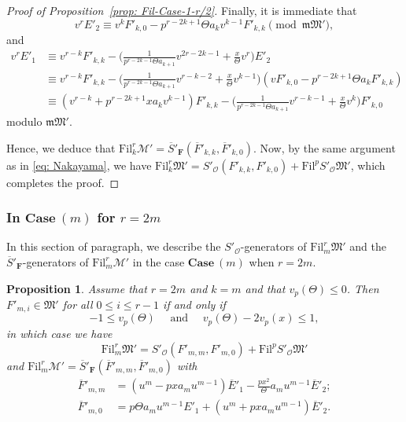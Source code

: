 \documentclass[11pt]{amsart}
\theoremstyle{definition}
\numberwithin{equation}{subsection}
\theoremstyle{plain}
\theoremstyle{plain}
\theoremstyle{plain}
\theoremstyle{plain}
\theoremstyle{plain}
\theoremstyle{plain}
\theoremstyle{plain}
\theoremstyle{plain}
\newtheorem{prop}[equation]{Proposition}
\theoremstyle{plain}
\theoremstyle{plain}
\theoremstyle{plain}
\theoremstyle{plain}
\theoremstyle{definition}
\theoremstyle{definition}
\theoremstyle{definition}
\theoremstyle{remark}
\renewcommand{\(}{\textup{(}}
\renewcommand{\)}{\textup{)}}
\newcommand{\F}{\mathbf{F}}
\newcommand{\barS}{\overline{S}}
\newcommand{\cM}{\mathcal{M}}
\newcommand{\fM}{\mathfrak{M}}
\newcommand{\fm}{\mathfrak{m}}
\newcommand{\Fil}{\mathrm{Fil}}
\newcommand{\cO}{\mathcal{O}}
\newcommand{\barE}{\overline{E}}
\newcommand{\barF}{\overline{F}}
\begin{document}
\begin{proof}[Proof of Proposition~\ref{prop: Fil-Case-1-r/2}]
Finally, it is immediate that $$v^rE'_2
    \equiv
    v^{k}F'_{k,0}-p^{r-2k+1}\Theta a_kv^{k-1}F'_{k,k}\pmod{\fm\fM'},$$
and
\begin{align*}
v^rE'_1
    &\equiv v^{r-k}F'_{k,k}-\bigg(\frac{1}{p^{r-2k-1}\Theta a_{k+1}}v^{2r-2k-1}+\frac{x}{\Theta}v^r\bigg)E'_2 \\
    &\equiv v^{r-k}F'_{k,k}-\bigg(\frac{1}{p^{r-2k-1}\Theta a_{k+1}}v^{r-k-2}+\frac{x}{\Theta}v^{k-1}\bigg)\left(vF'_{k,0}-p^{r-2k+1}\Theta a_kF'_{k,k}\right)\\
    &\equiv
    (v^{r-k}+p^{r-2k+1}xa_kv^{k-1})F'_{k,k}
    -\bigg(\frac{1}{p^{r-2k-1}\Theta a_{k+1}}v^{r-k-1}+\frac{x}{\Theta}v^k\bigg)F'_{k,0}
\end{align*}
modulo $\fm\fM'$.


Hence, we deduce that $\Fil^r_{k}\cM'=\barS'_\F(\barF'_{k,k},\barF'_{k,0})$. Now, by the same argument as in \eqref{eq: Nakayama}, we have $\Fil^r_{k}\fM'=S'_\cO(F'_{k,k},F'_{k,0})+\Fil^pS'_\cO\fM'$, which completes the proof.
\end{proof}





\subsubsection{\textbf{In $\mathbf{Case}~(m)$ for $r=2m$}}
In this section of paragraph, we describe the $S'_\cO$-generators of $\Fil^r_{m}\fM'$ and the $\barS'_\F$-generators of $\Fil^r_{m}\cM'$ in the case $\mathbf{Case}~(m)$ when $r=2m$.

\begin{prop}\label{prop: Fil-Case-m}
Assume that $r=2m$ and $k=m$ and that $v_p(\Theta)\leq 0$. Then $F'_{m,i}\in\fM'$ for all $0\leq i\leq r-1$ if and only if
\begin{equation}\label{eq: condition for k=m r=2m}
-1\leq v_p(\Theta) \quad\mbox{ and }\quad v_p(\Theta)-2v_p(x)\leq 1,
\end{equation}
in which case we have
$$\Fil^r_{m}\fM'=S'_\cO(F'_{m,m},F'_{m,0})+\Fil^pS'_\cO\fM'$$ and $\Fil^r_{m}\cM'=\barS'_\F(\barF'_{m,m},\barF'_{m,0})$ with
    \begin{align*}
    \barF'_{m,m}&=(u^m-pxa_mu^{m-1})\barE'_1-\frac{px^2}{\Theta}a_mu^{m-1}\barE'_2; \\
    \barF'_{m,0}&=p\Theta a_mu^{m-1}E'_1+(u^m+pxa_mu^{m-1})\barE'_2.
    \end{align*}
\end{prop}
\end{document}
